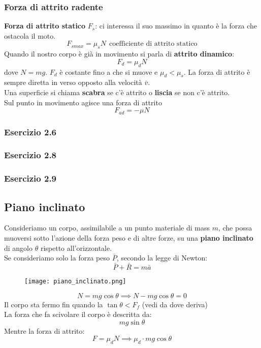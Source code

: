 \documentclass[../../main.tex]{subfiles}
\begin{document}
\subsubsection{Forza di attrito radente}
\textbf{Forza di attrito statico} $F_s$: ci interessa il suo massimo in quanto è la forza che ostacola il moto.
\[
    F_{s max} = \mu_s N \ \ \text{coefficiente di attrito statico}
\]
Quando il nostro corpo è già in movimento si parla di \textbf{attrito dinamico}:
\[
    F_d = \mu_d N
\]
dove $N = mg$. $F_d$ è costante fino a che si muove e $\mu_d < \mu_s$. La forza di attrito è sempre diretta in verso opposto alla velocità $\bar v$.\\
Una superficie si chiama \textbf{scabra} se c'è attrito o \textbf{liscia} se non c'è attrito.\\
Sul punto in movimento agisce una forza di attrito
\[
    F_{ad} = -\mu N
\]

\subsubsection{Esercizio 2.6}

\subsubsection{Esercizio 2.8}

\subsubsection{Esercizio 2.9}

\subsection{Piano inclinato}
Consideriamo un corpo, assimilabile a un punto materiale di mass $m$, che possa muoversi sotto l'azione della forza peso e di altre forze, su una \textbf{piano inclinato} di angolo $\theta$ rispetto all'orizzontale.\\
Se consideriamo solo la forza peso $\bar P$, secondo la legge di Newton:
\[
    \bar P + \bar R = m\bar a
\]
\begin{figure}[H]
    \centering
    \texttt{[image: piano\_inclinato.png]}
\end{figure}
\[
    N = mg\cos\theta \implies N - mg\cos\theta = 0
\]
Il corpo sta fermo fin quando la $\tan\theta < F_f$ (vedi da dove deriva)\\
La forza che fa scivolare il corpo è descritta da:
\[
    mg\sin\theta
\]
Mentre la forza di attrito:
\[
    F = \mu_d N \implies \mu_d \cdot mg\cos\theta
\]
\end{document}
